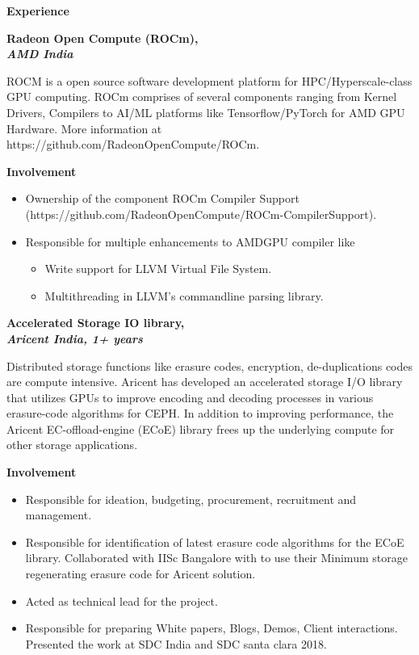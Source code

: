 \documentclass[a4paper,10pt]{memoir} %
\newcommand{\Sep}{\vspace{1em}} %
\newcommand{\SmallSep}{\vspace{0.5em}} %
\newcommand{\CVSection}[1]{ %
{\Large\textbf{#1}}\par
\SmallSep %
}
\newcommand{\CVItem}[2]{ %
\textbf{\color{RoyalBlue} #1}\par
#2
\SmallSep %
}
\begin{document}
\Sep

\CVSection{Experience}

\CVItem{Radeon Open Compute (ROCm), \\
	\textit{AMD India}} {
	ROCM is a open source software development platform for HPC/Hyperscale-class GPU computing. ROCm comprises of several components ranging from Kernel Drivers, Compilers to AI/ML platforms like Tensorflow/PyTorch for AMD GPU Hardware. More information at https://github.com/RadeonOpenCompute/ROCm.
		
	\textbf{Involvement}
	\renewcommand{\labelitemi}{$\bullet$}
	\begin{itemize}
		\item Ownership of the component ROCm Compiler Support 
			(https://github.com/RadeonOpenCompute/ROCm-CompilerSupport).
		\item Responsible for multiple enhancements to AMDGPU compiler like
		\renewcommand{\labelitemi}{$\bullet$}
		\begin{itemize}
			\item Write support for LLVM Virtual File System.
			\item Multithreading in LLVM's commandline parsing library.
		\end{itemize}		
	\end{itemize}
	\hrulefill
}


\CVItem{Accelerated Storage IO library, \\
\textit{Aricent India, 1+ years}} {
Distributed storage functions like erasure codes, encryption, de-duplications codes are compute intensive. Aricent has developed an accelerated storage I/O library that utilizes GPUs to improve encoding and decoding processes in various erasure-code algorithms for CEPH. In addition to improving performance, the Aricent EC-offload-engine (ECoE) library frees up the underlying compute for other storage applications. 

\textbf{Involvement}
\renewcommand{\labelitemi}{$\bullet$}
\begin{itemize}
\item Responsible for ideation, budgeting, procurement, recruitment and management. 
\item Responsible for identification of latest erasure code algorithms for the ECoE library. Collaborated with IISc Bangalore with to use their Minimum storage regenerating erasure code for Aricent solution. 
\item Acted as technical lead for the project. 
\item Responsible for preparing White papers, Blogs, Demos, Client interactions. Presented the work at SDC India and SDC santa clara 2018.  
\end{itemize}
\hrulefill
}
\end{document}
